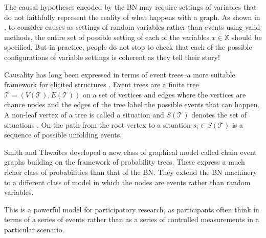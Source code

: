 \documentclass[12pt]{article}
\begin{document}
%
%
%


The causal hypotheses encoded by the BN may require settings of variables that do not faithfully represent the reality of what happens with a graph. As shown in \cite{SPIRTES}, to consider causes as settings of random variables rather than events using valid methods, the entire set of possible setting of each of the variables $x \in \mathbb{X}$ should be specified. But in practice, people do not stop to check that each of the possible configurations of variable settings is coherent as they tell their story! 


Causality has long been expressed in terms of event trees--a more suitable framework for elicited structures \cite{Shafer1996}.
Event trees are a finite tree $\mathcal{T} = (V(\mathcal{T}), E(\mathcal{T}))$ on a set of vertices and edges where the vertices are chance nodes and the edges of the tree label the possible events that can happen. A non-leaf vertex of a tree is called a situation and $S(\mathcal{T})$ denotes the set of situations \cite{Barclay2015}. 
On the path from the root vertex to a situation $s_i \in S(\mathcal{T})$ is a sequence of possible unfolding events.

Smith and Thwaites developed a new class of graphical model called chain event graphs building on the framework of probability trees. These express a much richer class of probabilities than that of the BN. %
They extend the BN machinery to a different class of model in which the nodes are events rather than random variables.

This is a powerful model for participatory research, as participants often think in terms of a series of events rather than as a series of controlled measurements in a particular scenario. 
\end{document}
